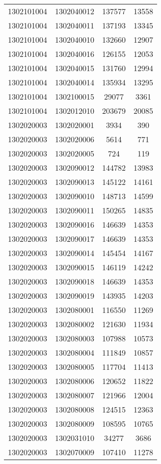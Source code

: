 \begin{longtable}{llcc}
1302101004 & 1302040012 & 137577 & 13558\\
1302101004 & 1302040011 & 137193 & 13345\\
1302101004 & 1302040010 & 132660 & 12907\\
1302101004 & 1302040016 & 126155 & 12053\\
1302101004 & 1302040015 & 131760 & 12994\\
1302101004 & 1302040014 & 135934 & 13295\\
1302101004 & 1302100015 & 29077 & 3361\\
1302101004 & 1302012010 & 203679 & 20085\\
1302020003 & 1302020001 & 3934 & 390\\
1302020003 & 1302020006 & 5614 & 771\\
1302020003 & 1302020005 & 724 & 119\\
1302020003 & 1302090012 & 144782 & 13983\\
1302020003 & 1302090013 & 145122 & 14161\\
1302020003 & 1302090010 & 148713 & 14599\\
1302020003 & 1302090011 & 150265 & 14835\\
1302020003 & 1302090016 & 146639 & 14353\\
1302020003 & 1302090017 & 146639 & 14353\\
1302020003 & 1302090014 & 145454 & 14167\\
1302020003 & 1302090015 & 146119 & 14242\\
1302020003 & 1302090018 & 146639 & 14353\\
1302020003 & 1302090019 & 143935 & 14203\\
1302020003 & 1302080001 & 116550 & 11269\\
1302020003 & 1302080002 & 121630 & 11934\\
1302020003 & 1302080003 & 107988 & 10573\\
1302020003 & 1302080004 & 111849 & 10857\\
1302020003 & 1302080005 & 117704 & 11413\\
1302020003 & 1302080006 & 120652 & 11822\\
1302020003 & 1302080007 & 121966 & 12004\\
1302020003 & 1302080008 & 124515 & 12363\\
1302020003 & 1302080009 & 108595 & 10765\\
1302020003 & 1302031010 & 34277 & 3686\\
1302020003 & 1302070009 & 107410 & 11278\\

\end{longtable}
